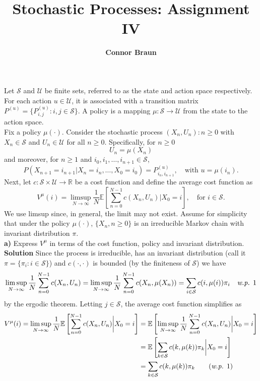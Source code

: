 \documentclass[11pt, letterpaper]{article}
\title{\bf Stochastic Processes: Assignment IV}
\author{\bf Connor Braun}
\date{}
\newcommand{\mbb}[1]{\mathbb{#1}}
\newcommand{\mc}[1]{\mathcal{#1}}
\begin{document}
    
    \maketitle
     Let $\mc{S}$ and $\mc{U}$ be finite sets, referred to as the state and action space respectively.
    For each action $u\in\mc{U}$, it is associated with a transition matrix $P^{(u)}=\{P_{i,j}^{(u)}:i,j\in\mc{S}\}$. A policy is a mapping
    $\mu:\mc{S}\rightarrow\mc{U}$ from the state to the action space.\\[10pt]
    Fix a policy $\mu(\cdot)$. Consider the stochastic process ${(X_n,U_n):n\geq 0}$ with $X_n\in\mc{S}$ and $U_n\in\mc{U}$ for all $n\geq 0$.
    Specifically, for $n\geq 0$
    \[U_n=\mu(X_n)\]
    and moreover, for $n\geq 1$ and $i_0,i_1,\dots,i_{n+1}\in\mc{S}$,
    \[P(X_{n+1}=i_{n+1}|X_n=i_n,\dots,X_0=i_0)=P^{(u)}_{i_n,i_{n+1}},\quad\text{with $u=\mu(i_n)$}.\tag{1}\]
    Next, let $c:\mc{S}\times\mc{U}\rightarrow\mbb{R}$ be a cost function and define the average cost function as 
    \[V^\mu(i)=\limsup_{N\rightarrow\infty}\frac{1}{N}\mbb{E}\left[\sum_{n=0}^{N-1}c(X_n,U_n)\bigg|X_0=i\right],\quad\text{for $i\in \mc{S}$.}\]
    We use limsup since, in general, the limit may not exist. Assume for simplicity that under the policy $\mu(\cdot)$, $\{X_n,n\geq 0\}$ is an irreducible
    Markov chain with invariant distribution $\pi$.\\[10pt]
    {\bf a)} Express $V^\mu$ in terms of the cost function, policy and invariant distribution.\\[10pt]
    {\bf Solution} Since the process is irreducible, has an invariant distribution (call it $\pi=\{\pi_i:i\in\mc{S}\}$) and $c(\cdot,\cdot)$ is bounded (by the finiteness of $\mc{S}$)
    we have
    \[\limsup_{N\rightarrow\infty}\frac{1}{N}\sum_{n=0}^{N-1}c(X_n,U_n)=\limsup_{N\rightarrow\infty}\frac{1}{N}\sum_{n=0}^{N-1}c(X_n,\mu(X_n))=\sum_{i\in \mc{S}}c(i,\mu(i))\pi_i\quad\text{{\it w.p.} 1}\] 
    by the ergodic theorem. Letting $j\in\mc{S}$, the average cost function simplifies as
    \begin{align*}
        V^\mu(i)=\limsup_{N\rightarrow\infty}\frac{1}{N}\mbb{E}\left[\sum_{n=0}^{N-1}c(X_n,U_n)\bigg|X_0=i\right]&=\mbb{E}\left[\limsup_{N\rightarrow\infty}\frac{1}{N}\sum_{n=0}^{N-1}c(X_n,U_n)\bigg|X_0=i\right]\\
        &=\mbb{E}\left[\sum_{k\in\mc{S}}c(k,\mu(k))\pi_k\bigg|X_0=i\right]\\
        &=\sum_{k\in\mc{S}}c(k,\mu(k))\pi_k\tag{{\it w.p. $1$}}
    \end{align*}
\end{document}

